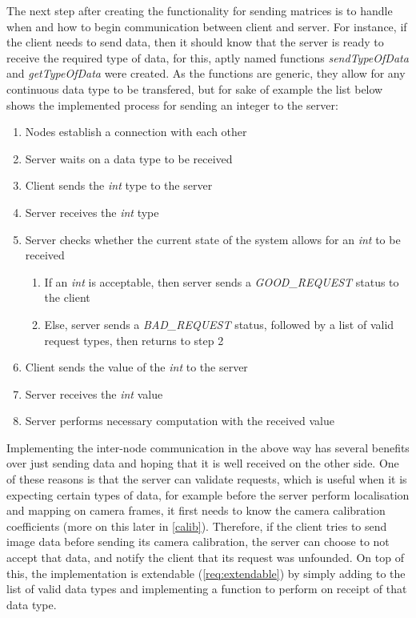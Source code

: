 The next step after creating the functionality for sending matrices is to handle when and how to begin communication between client and server. For instance, if the client needs to send data, then it should know that the server is ready to receive the required type of data, for this, aptly named functions \textit{sendTypeOfData} and \textit{getTypeOfData} were created. As the functions are generic, they allow for any continuous data type to be transfered, but for sake of example the list below shows the implemented process for sending an integer to the server:

\begin{enumerate}
	\item Nodes establish a connection with each other
	\item Server waits on a data type to be received
	\item Client sends the \textit{int} type to the server
	\item Server receives the \textit{int} type
	\item Server checks whether the current state of the system allows for an \textit{int} to be received
	\begin{enumerate}
		\item If an \textit{int} is acceptable, then server sends a \textit{GOOD\_REQUEST} status to the client
		\item Else, server sends a \textit{BAD\_REQUEST} status, followed by a list of valid request types, then returns to step 2
	\end{enumerate}
	\item Client sends the value of the \textit{int} to the server
	\item Server receives the \textit{int} value
	\item Server performs necessary computation with the received value
\end{enumerate}

Implementing the inter-node communication in the above way has several benefits over just sending data and hoping that it is well received on the other side. One of these reasons is that the server can validate requests, which is useful when it is expecting certain types of data, for example before the server perform localisation and mapping on camera frames, it first needs to know the camera calibration coefficients (more on this later in \cref{calib}). Therefore, if the client tries to send image data before sending its camera calibration, the server can choose to not accept that data, and notify the client that its request was unfounded. On top of this, the implementation is extendable (\cref{req:extendable}) by simply adding to the list of valid data types and implementing a function to perform on receipt of that data type.


